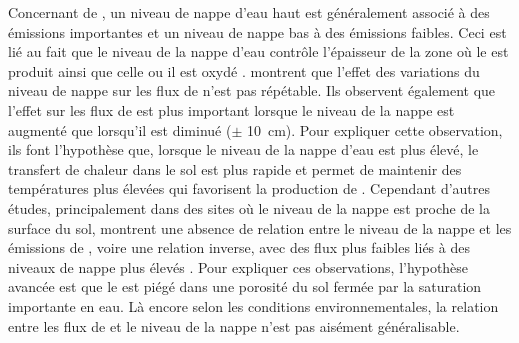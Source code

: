 Concernant de \chh, un niveau de nappe d'eau haut est généralement associé à des émissions importantes et un niveau de nappe bas à des émissions faibles.
Ceci est lié au fait que le niveau de la nappe d'eau contrôle l'épaisseur de la zone où le \chh est produit ainsi que celle ou il est oxydé \citep{pelletier2007}.
\citet{turetsky2008} montrent que l'effet des variations du niveau de nappe sur les flux de \chh n'est pas répétable.
Ils observent également que l'effet sur les flux de \chh est plus important lorsque le niveau de la nappe est augmenté que lorsqu'il est diminué ($\pm$ \SI{10}{\centi\metre}).
Pour expliquer cette observation, ils font l'hypothèse que, lorsque le niveau de la nappe d'eau est plus élevé, le transfert de chaleur dans le sol est plus rapide et permet de maintenir des températures plus élevées qui favorisent la production de \chh.
Cependant d'autres études, principalement dans des sites où le niveau de la nappe est proche de la surface du sol, montrent une absence de relation entre le niveau de la nappe et les émissions de \chh, voire une relation inverse, avec des flux plus faibles liés à des niveaux de nappe plus élevés \citep{kettunen1996,bellisario1999,treat2007}.
Pour expliquer ces observations, l'hypothèse avancée est que le \chh est piégé dans une porosité du sol fermée par la saturation importante en eau.
Là encore selon les conditions environnementales, la relation entre les flux de \chh et le niveau de la nappe n'est pas aisément généralisable.

